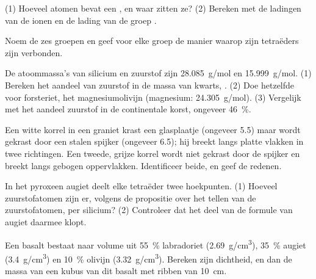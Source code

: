 \begin{exercise}[$\star$]\label{exo:g11:minerals:4}
(1) Hoeveel atomen bevat een , en waar zitten
ze? (2) Bereken met de ladingen van de ionen  en  de
lading van de groep .
\end{exercise}

\begin{exercise}[$\star$]\label{exo:g11:minerals:5}
Noem de zes groepen  en geef voor elke groep de manier
waarop zijn tetraëders zijn verbonden.
\end{exercise}

\begin{exercise}[$\star\star$]\label{exo:g11:minerals:6}
De atoommassa's van silicium en zuurstof zijn \qty{28.085}{g/mol} en
\qty{15.999}{g/mol}. (1) Bereken het aandeel van zuurstof in de massa van kwarts,
. (2) Doe hetzelfde voor forsteriet, het magnesiumolivijn
 (magnesium: \qty{24.305}{g/mol}). (3) Vergelijk met het aandeel
zuurstof in de continentale korst, ongeveer \qty{46}{\percent}.
\end{exercise}

\begin{exercise}[$\star\star$]\label{exo:g11:minerals:7}
Een witte korrel in een graniet krast een glasplaatje (ongeveer 5.5) maar wordt
gekrast door een stalen spijker (ongeveer 6.5); hij breekt langs platte vlakken in twee
richtingen. Een tweede, grijze korrel wordt niet gekrast door de spijker en breekt
langs gebogen oppervlakken. Identificeer beide, en geef de redenen.
\end{exercise}

\begin{exercise}[$\star\star$]\label{exo:g11:minerals:8}
In het pyroxeen augiet deelt elke tetraëder twee hoekpunten. (1) Hoeveel zuurstofatomen
zijn er, volgens de propositie over het tellen van de zuurstofatomen, per
silicium? (2) Controleer dat het deel  van de formule van augiet
daarmee klopt.
\end{exercise}

\begin{exercise}[$\star\star$]\label{exo:g11:minerals:9}
Een basalt bestaat naar volume uit \qty{55}{\percent} labradoriet (\qty{2.69}{g/cm^3}),
\qty{35}{\percent} augiet (\qty{3.4}{g/cm^3}) en \qty{10}{\percent} olivijn
(\qty{3.32}{g/cm^3}). Bereken zijn dichtheid, en dan de massa van een
kubus van dit basalt met ribben van \qty{10}{cm}.
\end{exercise}

